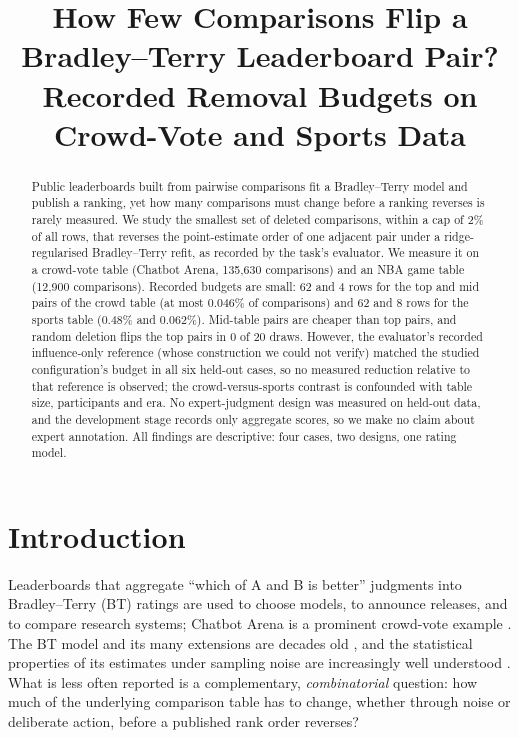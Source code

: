 \documentclass{article}
\title{How Few Comparisons Flip a Bradley--Terry Leaderboard Pair? Recorded Removal Budgets on Crowd-Vote and Sports Data}
\author{}
\begin{document}
\maketitle

\begin{abstract}
Public leaderboards built from pairwise comparisons fit a Bradley--Terry model and publish a ranking, yet how many comparisons must change before a ranking reverses is rarely measured. We study the smallest set of deleted comparisons, within a cap of 2\% of all rows, that reverses the point-estimate order of one adjacent pair under a ridge-regularised Bradley--Terry refit, as recorded by the task's evaluator. We measure it on a crowd-vote table (Chatbot Arena, 135,630 comparisons) and an NBA game table (12,900 comparisons). Recorded budgets are small: 62 and 4 rows for the top and mid pairs of the crowd table (at most 0.046\% of comparisons) and 62 and 8 rows for the sports table (0.48\% and 0.062\%). Mid-table pairs are cheaper than top pairs, and random deletion flips the top pairs in 0 of 20 draws. However, the evaluator's recorded influence-only reference (whose construction we could not verify) matched the studied configuration's budget in all six held-out cases, so no measured reduction relative to that reference is observed; the crowd-versus-sports contrast is confounded with table size, participants and era. No expert-judgment design was measured on held-out data, and the development stage records only aggregate scores, so we make no claim about expert annotation. All findings are descriptive: four cases, two designs, one rating model.
\end{abstract}

\section{Introduction}
Leaderboards that aggregate ``which of A and B is better'' judgments into Bradley--Terry (BT) ratings are used to choose models, to announce releases, and to compare research systems; Chatbot Arena is a prominent crowd-vote example \citep{https://doi.org/10.48550/arxiv.2403.04132}. The BT model and its many extensions are decades old \citep{Davidson1970OnET,Davidson1969MultivariatePC,Leonard1977AnAB}, and the statistical properties of its estimates under sampling noise are increasingly well understood \citep{Simons1999AsymptoticsWT,Gao2021UncertaintyQI,Li2021ThePO}. What is less often reported is a complementary, \emph{combinatorial} question: how much of the underlying comparison table has to change, whether through noise or deliberate action, before a published rank order reverses?
\end{document}
